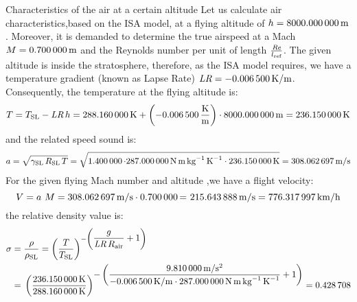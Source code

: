 \documentclass[[12pt,twoside]{book}
\begin{document}
%

%
\begin{myExampleX}{Characteristics of the air at a certain altitude}{}%
\label{example:Characteristics:Of:The:Air:At:A:Certain:Altitude}
%
\noindent
Let us calculate air characteristics,based on the ISA model, at a flying altitude of $h=\SI[round-precision=0]{\myAltitudeM}{m}$.
% 
Moreover, it is demanded to determine the true airspeed at a Mach $M=\SI[round-precision=2]{\myMachnumber}{m}$ and the Reynolds number per unit of length $\frac{\text{\itshape Re} }{l_\text{ref}}$. The given altitude is inside the stratosphere, therefore, as the ISA model requires, we have a temperature gradient (known as Lapse Rate) $\text{\itshape LR}=\SI[round-precision=4]{\myTemperaturegradient}{K/m}$.
Consequently, the temperature at the flying altitude is:
\[
T = {T_\text{SL}- \text{\itshape LR} \, h   
    = \SI[round-precision=2]{\myTemperaturesealevelK}{K}
        + \left( \SI[round-precision=4]{\myTemperaturegradient}{\frac{K}{m}} \right) \cdot\SI[round-precision=0]{\myAltitudeM}{m} } 
    = \SI[round-precision=1]{\myTemperatureK}{K}
\]
and the related speed sound is:
\[
a =\sqrt{
    \gamma_\text{SL} \, R_\text{SL} \,T}
    = \sqrt{
        \SI[round-precision=1]{\myAdiabaticindex} \cdot
        \SI[round-precision=0]{\myAirspecificconstant}{N\,m\,kg^{-1}\,K^{-1}} \cdot
        \SI[round-precision=2]{\myTemperatureK}{K}} 
    = \SI[round-precision=2]{\mySoundspeed}{m/s}
\]
\noindent
%
For the given flying Mach number and altitude ,we have a flight velocity:
\[
 V = {a }~{M} =\SI[round-precision=2]{\mySoundspeed}{m/s} \cdot \SI[round-precision=2]{\myMachnumber}= ~\SI[round-precision=2]{\mySpeedMs}{m/s} = \SI[round-precision=2]{\mySpeedkmh}{km/h} 
 \]
the relative density value is:
\[
\begin{split}
\sigma 
    & ={} \frac{\rho}{\rho_\text{SL}} = 
    \left( \frac{T}{T_\text{SL} } \right)^{
        -\left(\displaystyle \dfrac{ g }{\textit{LR}\, R_\text{air}} + 1 \right)
        } 
    \\ 
    & ={} \left(\frac{
        \SI[round-precision=2]{\myTemperatureK}{K} 
        }{
        \SI[round-precision=2]{\myTemperaturesealevelK}{K}
        }\right)^{\displaystyle
            -\left( \dfrac{
                \SI[round-precision=2]{\myGravitationalacceleration}{m/s^2}
                }{
                \SI[round-precision=4]{\myTemperaturegradient}{K/m}
                \cdot
                \SI[round-precision=0]{\myAirspecificconstant}{N\,m\,kg^{-1}\,K^{-1}}
                }{}
            + 1 \right)
        }
        = \SI[round-precision=3]{\myRelativedensity}{}
\end{split}
\]


\end{myExampleX}
\end{document}
